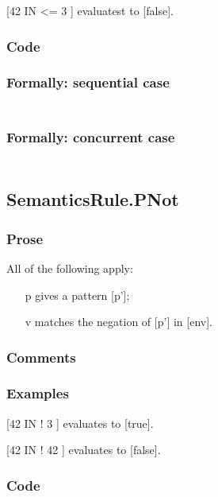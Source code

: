\documentclass{book}
\begin{document}
    [42 IN { <= 3 }] evaluatest to [false].

  \subsubsection{Code}

  \subsubsection{Formally: sequential case}
  \begin{align}
  \end{align} 

  \subsubsection{Formally: concurrent case}
  \begin{align}
  \end{align} 

\subsection{SemanticsRule.PNot \label{sec:SemanticsRule.PNot}}

    \subsubsection{Prose}
    All of the following apply:
    \begin{itemize}
    \item [p] gives a pattern [p'];
    \item [v] matches the negation of [p'] in [env].
    \end{itemize}
 
    \subsubsection{Comments}

    \subsubsection{Examples}
    [42 IN !{ 3 }] evaluates to [true].

    [42 IN !{ 42 }] evaluates to [false].

  \subsubsection{Code}
\end{document}
